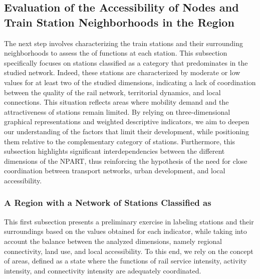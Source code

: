 \begin{refsegment}
\subsection{Evaluation of the Accessibility of Nodes and Train Station Neighborhoods in the Region
    \label{chap6:results-caracterisation-gares}
    }

The next step involves characterizing the train stations and their surrounding neighborhoods to assess the  of functions at each station. This subsection specifically focuses on stations classified as  a category that predominates in the studied network. Indeed, these stations are characterized by moderate or low values for at least two of the studied dimensions, indicating a lack of coordination between the quality of the rail network, territorial dynamics, and local connections. This situation reflects areas where mobility demand and the attractiveness of stations remain limited. By relying on three-dimensional graphical representations and weighted descriptive indicators, we aim to deepen our understanding of the factors that limit their development, while positioning them relative to the complementary category of  stations. Furthermore, this subsection highlights significant interdependencies between the different dimensions of the \acrshort{NPART}, thus reinforcing the hypothesis of the need for close coordination between transport networks, urban development, and local accessibility.%

\subsubsection*{A Region with a Network of Stations Classified as 
    \label{chap6:results-caracterisation-gares-dependance}
    }

This first subsection presents a preliminary exercise in labeling stations and their surroundings based on the values obtained for each indicator, while taking into account the balance between the analyzed dimensions, namely regional connectivity, land use, and local accessibility. To this end, we rely on the concept of  areas, defined as a state where the functions of rail service intensity, activity intensity, and connectivity intensity are adequately coordinated.%


\end{refsegment}
